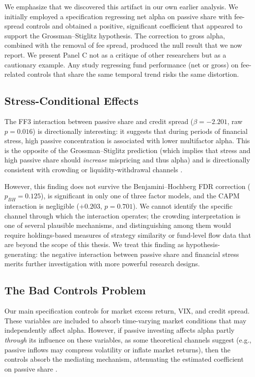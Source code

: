 \documentclass[11pt, a4paper]{article}
\begin{document}
We emphasize that we discovered this artifact in our own earlier analysis. We initially employed a specification regressing net alpha on passive share with fee-spread controls and obtained a positive, significant coefficient that appeared to support the Grossman--Stiglitz hypothesis. The correction to gross alpha, combined with the removal of fee spread, produced the null result that we now report. We present Panel C not as a critique of other researchers but as a cautionary example. Any study regressing fund performance (net or gross) on fee-related controls that share the same temporal trend risks the same distortion.

\subsection{Stress-Conditional Effects}

The FF3 interaction between passive share and credit spread ($\beta = -2.201$, raw $p = 0.016$) is directionally interesting: it suggests that during periods of financial stress, high passive concentration is associated with lower multifactor alpha. This is the opposite of the Grossman--Stiglitz prediction (which implies that stress and high passive share should \textit{increase} mispricing and thus alpha) and is directionally consistent with crowding or liquidity-withdrawal channels \parencite{sushko2018, coles2022, hameed2010}.

However, this finding does not survive the Benjamini--Hochberg FDR correction ($p_{BH} = 0.125$), is significant in only one of three factor models, and the CAPM interaction is negligible ($+0.203$, $p = 0.701$). We cannot identify the specific channel through which the interaction operates; the crowding interpretation is one of several plausible mechanisms, and distinguishing among them would require holdings-based measures of strategy similarity or fund-level flow data that are beyond the scope of this thesis. We treat this finding as hypothesis-generating: the negative interaction between passive share and financial stress merits further investigation with more powerful research designs.

\subsection{The Bad Controls Problem}

Our main specification controls for market excess return, VIX, and credit spread. These variables are included to absorb time-varying market conditions that may independently affect alpha. However, if passive investing affects alpha partly \textit{through} its influence on these variables, as some theoretical channels suggest (e.g., passive inflows may compress volatility or inflate market returns), then the controls absorb the mediating mechanism, attenuating the estimated coefficient on passive share \parencite{angrist2009}.
\end{document}
